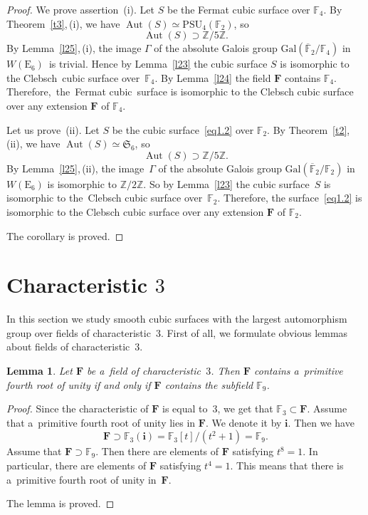 \documentclass{amsart}
\numberwithin{equation}{section}
\theoremstyle{plain}
\newtheorem{lemma}{Lemma}
\theoremstyle{definition}
\theoremstyle{remark}
\begin{document}
\begin{proof}
We prove assertion~(i). Let $S$ be the Fermat cubic surface over $\mathbb{F}_4$. By Theorem~\ref{t3},\,(i), we have $\operatorname{Aut}(S) \simeq \mathrm{PSU}_4(\mathbb{F}_2)$, so
$$
\operatorname{Aut}(S) \supset \mathbb{Z}/5\mathbb{Z}.
$$
By Lemma~\ref{l25},\,(i), the image $\Gamma$ of the absolute Galois group $\mathrm{Gal}(\overline{\mathbb{F}}_2/\mathbb{F}_4)$ in $W(\mathrm{E}_6)$~is tri\-vial. Hence by Lemma~\ref{l23} the cubic surface $S$ is isomorphic to the Clebsch~cubic sur\-face over~$\mathbb{F}_4$. By Lemma~\ref{l24} the field $\mathbf{F}$ contains $\mathbb{F}_4$. Therefore,~the~Fermat cubic~surface is isomorphic to the Clebsch cubic surface over any extension $\mathbf{F}$ of $\mathbb{F}_4$.

Let us prove~(ii). Let $S$ be the cubic surface~\eqref{eq1.2} over $\mathbb{F}_2$. By Theorem~\ref{t2},\,(ii), we have $\operatorname{Aut}(S) \simeq \mathfrak{S}_6$, so
$$
\operatorname{Aut}(S) \supset \mathbb{Z}/5\mathbb{Z}.
$$
By Lemma~\ref{l25},\,(ii), the image~$\Gamma$ of the absolute Galois group $\mathrm{Gal}(\overline{\mathbb{F}}_2/\mathbb{F}_2)$ in $W(\mathrm{E}_6)$ is isomorphic to $\mathbb{Z}/2\mathbb{Z}$. So by Lemma~\ref{l23} the cubic surface~$S$ is isomorphic to the~Clebsch cubic surface over~$\mathbb{F}_2$. Therefore, the surface~\eqref{eq1.2} is isomorphic to the Clebsch cubic surface over any extension $\mathbf{F}$ of $\mathbb{F}_2$.

The corollary is proved.
\end{proof}







\section{Characteristic $3$}
\label{s5}

In this section we study smooth cubic surfaces with the largest automorphism group over fields of characteristic~$3$. First of all, we formulate obvious lemmas about fields of characteristic~$3$.

\begin{lemma}
\label{l26}
Let $\mathbf{F}$ be a~field of characteristic~$3$. Then $\mathbf{F}$ contains a~primitive fourth root of unity if and only if\/ $\mathbf{F}$ contains the subfield $\mathbb{F}_9$.
\end{lemma}

\begin{proof}
Since the characteristic of $\mathbf{F}$ is equal to~$3$, we get that $\mathbb{F}_3 \subset \mathbf{F}$. Assume that a~primitive fourth root of unity lies in $\mathbf{F}$. We denote it by $\mathbf{i}$. Then we have
$$
\mathbf{F} \supset \mathbb{F}_3(\mathbf{i})=\mathbb{F}_3[t]/(t^2+1)=\mathbb{F}_9.
$$
Assume that $\mathbf{F} \supset \mathbb{F}_9$. Then there are elements of $\mathbf{F}$ satisfying $t^8=1$. In particular, there are elements of $\mathbf{F}$ satisfying $t^4=1$. This means that there is a~primitive fourth root of unity in~$\mathbf{F}$.

The lemma is proved.
\end{proof}
\end{document}
